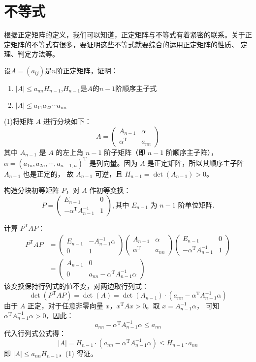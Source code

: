 \section{不等式}
根据正定矩阵的定义，我们可以知道，正定矩阵与不等式有着紧密的联系。关于正定矩阵的不等式有很多，要证明这些不等式就要综合的运用正定矩阵的性质、
定理、判定方法等。
\begin{example}
    设$A=(a_{ij})$是$n$阶正定矩阵，证明：\begin{enumerate}
        \item $|A|\leqslant a_{nn}H_{n-1}$,$H_{n-1}$是$A$的$n-1$阶顺序主子式
        \item $|A|\leqslant a_{11}a_{22}\cdots a_{nn}$
    \end{enumerate}
\end{example}
\begin{solution}
    (1)将矩阵 $A$ 进行分块如下：
\[
A = \begin{pmatrix} A_{n-1} & \alpha \\ \alpha^\mathrm{T} & a_{nn} \end{pmatrix}
\]
其中 $A_{n-1}$ 是 $A$ 的左上角 $n-1$ 阶子矩阵（即 $n-1$ 阶顺序主子阵），
$\alpha = (a_{1n}, a_{2n}, \cdots, a_{n-1,n})^\mathrm{T}$ 是列向量。因为 $A$ 是正定矩阵，所以其顺序主子阵 $A_{n-1}$ 也是正定的，
故 $A_{n-1}$ 可逆，且 $H_{n-1} = \det(A_{n-1}) > 0$。

构造分块初等矩阵 $P$，对 $A$ 作初等变换：
\[
P = \begin{pmatrix} E_{n-1} & 0 \\ -\alpha^\mathrm{T} A_{n-1}^{-1} & 1 \end{pmatrix},
\text{其中 $E_{n-1}$ 为 $n-1$ 阶单位矩阵.}\]

计算 $P^\mathrm{T} A P$：
\begin{align*}
P^\mathrm{T} A P &= \begin{pmatrix} E_{n-1} & -A_{n-1}^{-1}\alpha \\ 0 & 1 \end{pmatrix} 
\begin{pmatrix} A_{n-1} & \alpha \\ \alpha^\mathrm{T} & a_{nn} \end{pmatrix} 
\begin{pmatrix} E_{n-1} & 0 \\ -\alpha^\mathrm{T} A_{n-1}^{-1} & 1 \end{pmatrix} \\
&= \begin{pmatrix} A_{n-1} & 0 \\ 0 & a_{nn} - \alpha^\mathrm{T} A_{n-1}^{-1}\alpha \end{pmatrix}
\end{align*}
该变换保持行列式的值不变，对两边取行列式：
\[
\det(P^\mathrm{T} A P) = \det(A) = \det(A_{n-1}) \cdot (a_{nn} - \alpha^\mathrm{T} A_{n-1}^{-1}\alpha)
\]
由于 $A$ 正定，对于任意非零向量 $x$，$x^\mathrm{T} A x > 0$。取 $x = A_{n-1}^{-1}\alpha$，
可知 $\alpha^\mathrm{T} A_{n-1}^{-1}\alpha > 0$，因此：
\[
a_{nn} - \alpha^\mathrm{T} A_{n-1}^{-1}\alpha \le a_{nn}
\]
代入行列式公式得：
\[
|A| = H_{n-1} \cdot (a_{nn} - \alpha^\mathrm{T} A_{n-1}^{-1}\alpha) \le H_{n-1} \cdot a_{nn}
\]
即 $|A| \le a_{nn}H_{n-1}$，(1) 得证。


\end{solution}
